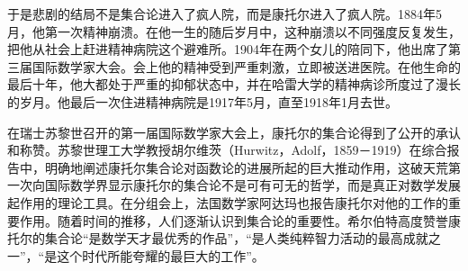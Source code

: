 \documentclass[b5paper]{ctexart}
\begin{document}
\begin{mdframed}
于是悲剧的结局不是集合论进入了疯人院，而是康托尔进入了疯人院。1884年5月，他第一次精神崩溃。在他一生的随后岁月中，这种崩溃以不同强度反复发生，把他从社会上赶进精神病院这个避难所。1904年在两个女儿的陪同下，他出席了第三届国际数学家大会。会上他的精神受到严重刺激，立即被送进医院。在他生命的最后十年，他大都处于严重的抑郁状态中，并在哈雷大学的精神病诊所度过了漫长的岁月。他最后一次住进精神病院是1917年5月，直至1918年1月去世。

在瑞士苏黎世召开的第一届国际数学家大会上，康托尔的集合论得到了公开的承认和称赞。苏黎世理工大学教授胡尔维茨（Hurwitz，Adolf，1859－1919）在综合报告中，明确地阐述康托尔集合论对函数论的进展所起的巨大推动作用，这破天荒第一次向国际数学界显示康托尔的集合论不是可有可无的哲学，而是真正对数学发展起作用的理论工具。在分组会上，法国数学家阿达玛也报告康托尔对他的工作的重要作用。随着时间的推移，人们逐渐认识到集合论的重要性。希尔伯特高度赞誉康托尔的集合论“是数学天才最优秀的作品”，“是人类纯粹智力活动的最高成就之一”，“是这个时代所能夸耀的最巨大的工作”。
\end{mdframed}
\end{document}
